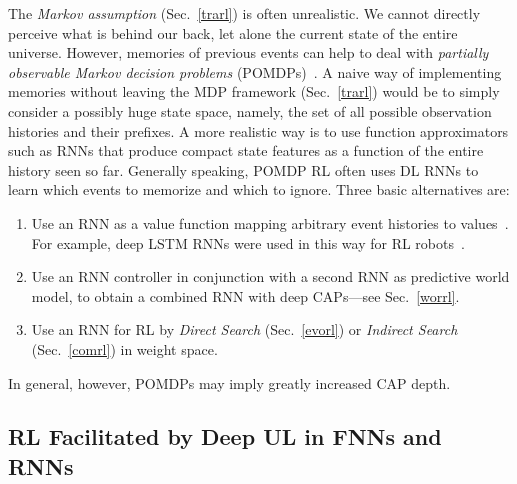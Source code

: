\documentclass[letterpaper]{article}
\begin{document}
\begin{CJK*}{UTF8}{gbsn}
The {\em Markov assumption} 
(Sec.~\ref{trarl}) is often unrealistic. We cannot directly perceive 
what is behind our back, let alone the current state of the entire universe. 
However, memories of previous events
can help to deal with  
{\em partially observable Markov decision problems} (POMDPs)~\citep[e.g.,][]{Schmidhuber:90sandiego,Schmidhuber:91nips,Ring:91,Ring:93,Ring:94,Williams:92,Lin:93,Teller:94,Kaelbling:95,Littman:95,Boutilier:96,Jaakkola:95,McCallum:96,kimura1997,Wiering:96levin,Wiering:97ab,otsuka2010}.
A naive way of implementing memories without leaving the MDP framework 
(Sec.~\ref{trarl}) would be to simply consider a 
possibly huge state space, namely, 
the set of all possible observation histories and their prefixes. 
A more realistic way is to use function approximators such as RNNs that produce 
compact state features as a function of the entire history seen so far.
Generally speaking, POMDP RL often uses DL RNNs to learn 
which events to memorize and which to ignore.
Three basic alternatives are: 
\begin{enumerate}
\item
Use an RNN as a value function mapping arbitrary event histories to values~\citep[e.g.,][]{Schmidhuber:90cmss,Schmidhuber:91nips,Lin:93,Bakker:01nips}. 
For example, deep LSTM RNNs were used in this way for RL robots~\citep{Bakker:03robot}.
\item
Use an RNN controller in conjunction with a second RNN as predictive world model,
to obtain a combined RNN with deep CAPs---see Sec.~\ref{worrl}.
\item
Use an RNN for RL by {\em Direct Search} (Sec.~\ref{evorl}) or {\em Indirect Search} (Sec.~\ref{comrl}) in weight space.
\end{enumerate}
In general, however, POMDPs may imply greatly increased CAP depth.



\subsection{RL Facilitated by Deep UL in FNNs and RNNs}
\label{unsrl}


\end{CJK*}
\end{document}
